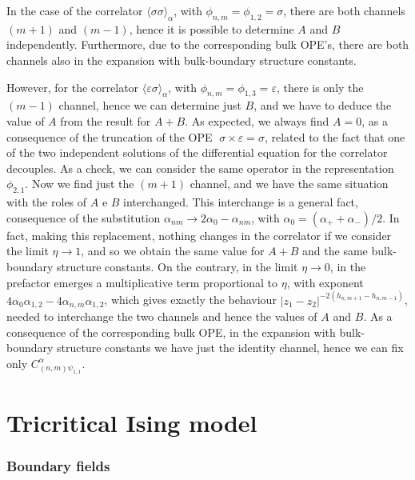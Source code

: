 \documentclass[a4paper,12pt]{report}
\begin{document}
\vspace{0.5cm}


In the case of the correlator $\langle\sigma\sigma\rangle_{\alpha}$, with $\phi _{n,m}=\phi _{1,2}=\sigma$, there
are both channels $(m+1)$ and $(m-1)$, hence it is possible to determine $A$ and $B$ independently. Furthermore,
due to the corresponding bulk OPE's, there are both channels also in the expansion with bulk-boundary structure
constants.


However, for the correlator $\langle\varepsilon\sigma\rangle_{\alpha}$, with $\phi _{n,m}=\phi
_{1,3}=\varepsilon$, there is only the $(m-1)$ channel, hence we can determine just $B$, and we have to deduce the
value of $A$ from the result for $A+B$. As expected, we always find $A=0$, as a consequence of the truncation of
the OPE $\; \sigma\times\varepsilon=\sigma$, related to the fact that one of the two independent solutions of the
differential equation for the correlator decouples. As a check, we can consider the same operator in the
representation $\phi _{2,1}$. Now we find just the $(m+1)$ channel, and we have the same situation with the roles
of $A$ e $B$ interchanged. This interchange is a general fact, consequence of the substitution $\alpha
_{nm}\rightarrow 2\alpha _{0}-\alpha _{nm}$, with $\alpha _{0}=(\alpha _{+}+\alpha _{-})/2$. In fact, making this
replacement, nothing changes in the correlator if we consider the limit $\eta \rightarrow 1$, and so we obtain
the same value for $A+B$ and the same bulk-boundary structure constants. On the contrary, in the limit $ \eta
\rightarrow 0$, in the prefactor emerges a multiplicative term proportional to $\eta $, with exponent $4\alpha
_{0}\alpha _{1,2}-4\alpha _{n,m}\alpha _{1,2}$, which gives exactly the behaviour
$|z_{1}-z_{2}|^{-2\left(h_{n,m+1}-h_{n,m-1} \right)}$, needed to interchange the two channels and hence the
values of $A$ and $B$. As a consequence of the corresponding bulk OPE, in the expansion with bulk-boundary
structure constants we have just the identity channel, hence we can fix only $ C_{(n,m)\psi _{1,1}}^{\alpha}$.

\newpage

\section{Tricritical Ising model}

\subsubsection{Boundary fields}
\end{document}
